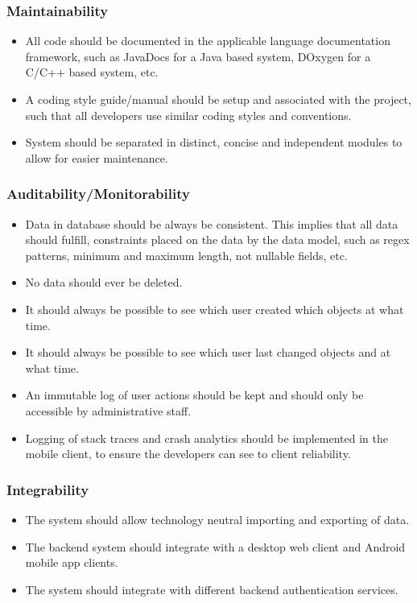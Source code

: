 \documentclass[a4paper,10pt]{article}
\begin{document}
\subsubsection{Maintainability}
\begin{itemize}
\item All code should be documented in the applicable language documentation framework, such as JavaDocs for a Java based system, DOxygen for a C/C++ based system, etc.
\item A coding style guide/manual should be setup and associated with the project, such that all developers use similar coding styles and conventions.
\item System should be separated in distinct, concise and independent modules to allow for easier maintenance.
\end{itemize}

\subsubsection{Auditability/Monitorability}
\begin{itemize}
\item Data in database should be always be consistent. This implies that all data should fulfill, constraints placed on the data by the data model, such as regex patterns, minimum and maximum length, not nullable fields, etc.
\item No data should ever be deleted.
\item It should always be possible to see which user created which objects at what time.
\item It should always be possible to see which user last changed objects and at what time.
\item An immutable log of user actions should be kept and should only be accessible by administrative staff.
\item Logging of stack traces and crash analytics should be implemented in the mobile client, to ensure the developers can see to client reliability.
\end{itemize}

\subsubsection{Integrability}
\begin{itemize}
\item The system should allow technology neutral importing and exporting of data.
\item The backend system should integrate with a desktop web client and Android mobile app clients.
\item The system should integrate with different backend authentication services.
\end{itemize}
\end{document}
